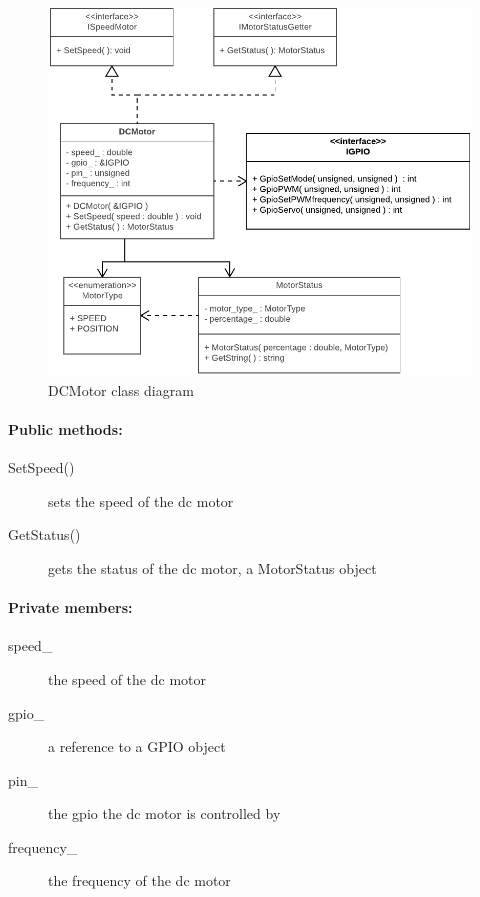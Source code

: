 \begin{figure}[H]
\centering
\includegraphics[max width=1\linewidth]{Images/Design/DCMotor_class_diagram}
\caption{DCMotor class diagram}
\label{fig:dcmotor}
\end{figure}

\paragraph{Public methods:}
\begin{adjustwidth}{2.5em}{0pt}\begin{description}
		\item [SetSpeed()] sets the speed of the dc motor
		\item [GetStatus()] gets the status of the dc motor, a MotorStatus object
\end{description}\end{adjustwidth}

\paragraph{Private members:}
\begin{adjustwidth}{2.5em}{0pt}\begin{description}
		\item [speed_] the speed of the dc motor
		\item [gpio_] a reference to a GPIO object
		\item [pin_] the gpio the dc motor is controlled by
		\item [frequency_] the frequency of the dc motor
\end{description}\end{adjustwidth}

